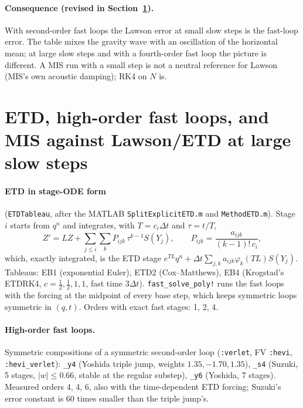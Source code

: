 \documentclass[11pt,a4paper]{article}
\newcommand{\code}[1]{\texttt{#1}}
\newcommand{\dt}{\Delta t}
\begin{document}
\paragraph{Consequence (revised in Section~\ref{sec:etd}).} With second-order fast loops the Lawson
error at small slow steps is the fast-loop error. The table mixes the gravity wave with an
oscillation of the horizontal mean; at large slow steps and with a fourth-order fast loop the
picture is different. A MIS run with a small step is not a neutral reference for Lawson (MIS's own
acoustic damping); RK4 on $N$ is.

\section{ETD, high-order fast loops, and MIS against Lawson/ETD at large slow steps}\label{sec:etd}

\paragraph{ETD in stage-ODE form} (\code{ETDTableau}, after the MATLAB \code{SplitExplicitETD.m} and
\code{MethodETD.m}). Stage $i$ starts from $q^n$ and integrates, with $T = c_i\dt$ and $\tau = t/T$,
\begin{equation}
  Z' = LZ + \sum_{j\le i}\sum_k P_{ijk}\,\tau^{k-1}S(Y_j),\qquad P_{ijk} = \frac{a_{ijk}}{(k-1)!\,c_i},
\end{equation}
which, exactly integrated, is the ETD stage $e^{TL}q^n + \dt\sum_{j,k}a_{ijk}\varphi_k(TL)S(Y_j)$.
Tableaus: EB1 (exponential Euler), ETD2 (Cox--Matthews), EB4 (Krogstad's ETDRK4, $c = \tfrac12,
\tfrac12, 1, 1$, fast time $3\dt$). \code{fast\_solve\_poly!} runs the fast loops with the forcing at
the midpoint of every base step, which keeps symmetric loops symmetric in $(q,t)$. Orders with
exact fast stages: 1, 2, 4.

\paragraph{High-order fast loops.} Symmetric compositions of a symmetric second-order loop
(\code{:verlet}, FV \code{:hevi}, \code{:hevi\_verlet}): \code{\_y4} (Yoshida triple jump, weights
$1.35, -1.70, 1.35$), \code{\_s4} (Suzuki, 5 stages, $|w|\le0.66$, stable at the regular substep),
\code{\_y6} (Yoshida, 7 stages). Measured orders 4, 4, 6, also with the time-dependent ETD forcing;
Suzuki's error constant is 60 times smaller than the triple jump's.
\end{document}
